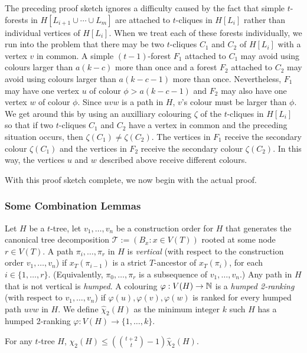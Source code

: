 \documentclass[kpfonts]{patmorin}
\newcommand{\trn}{\chi_2}
\newcommand{\htrn}{\hat{\chi}_2}
\theoremstyle{named}
\begin{document}
The preceding proof sketch ignores a difficulty caused by the fact that simple $t$-forests in $H[L_{i+1}\cup\cdots\cup L_m]$ are attached to $t$-cliques in $H[L_i]$ rather than individual vertices of $H[L_i]$.  When we treat each of these forests individually, we run into the problem that there may be two $t$-cliques $C_1$ and $C_2$ of $H[L_i]$ with a vertex $v$ in common.  A simple $(t-1)$-forest $F_1$ attached to $C_1$ may avoid using colours larger than $a(k-c)$ more than once and a forest $F_2$ attached to $C_2$ may avoid using colours larger than $a(k-c-1)$ more than once.  Nevertheless, $F_1$ may have one vertex $u$ of colour $\phi >a(k-c-1)$ and $F_2$ may also have one vertex $w$ of colour $\phi$.  Since $uvw$ is a path in $H$, $v$'s colour must be larger than $\phi$.  We get around this by using an auxilliary colouring $\zeta$ of the $t$-cliques in $H[L_i]$ so that if two $t$-cliques $C_1$ and $C_2$ have a vertex in common and the preceding situation occurs, then $\zeta(C_1)\neq \zeta(C_2)$.  The vertices in $F_1$ receive the secondary colour $\zeta(C_1)$ and the vertices in $F_2$ receive the secondary colour $\zeta(C_2)$.  In this way, the vertices $u$ and $w$ described above receive different colours.

With this proof sketch complete, we now begin with the actual proof.

\subsubsection{Some Combination Lemmas}

Let $H$ be a $t$-tree, let $v_1,\ldots,v_n$ be a construction order for $H$ that generates the canonical tree decomposition $\mathcal{T}:=(B_x:x\in V(T))$ rooted at some node $r\in V(T)$.  A path $\pi_i,\ldots,\pi_r$ in $H$ is \emph{vertical} (with respect to the construction order $v_1,\ldots,v_n$) if $x_T(\pi_{i-1})$ is a strict $T$-ancestor of $x_T(\pi_i)$, for each $i\in\{1,\ldots,r\}$. (Equivalently, $\pi_0,\ldots,\pi_r$ is a subsequence of $v_1,\ldots,v_n$.) Any path in $H$ that is not vertical is \emph{humped}.  A colouring $\varphi:V(H)\to\mathbb{N}$ is a \emph{humped 2-ranking} (with respect to $v_1,\ldots,v_n$) if $\varphi(u),\varphi(v),\varphi(w)$ is ranked for every humped path $uvw$ in $H$.  We define $\htrn(H)$ as the minimum integer $k$ such $H$ has a humped 2-ranking $\varphi:V(H)\to\{1,\ldots,k\}$.

\begin{lem}\label{humped}
    For any $t$-tree $H$, $\trn(H)\le (\binom{t+2}{t}-1)\htrn(H)$.
\end{lem}
\end{document}
